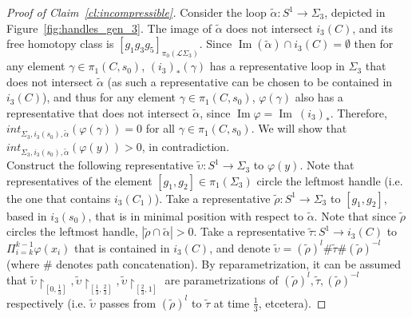 \documentclass[11pt]{article}
\DeclareMathOperator{\Ima}{Im}
\begin{document}
\begin{proof}[Proof of Claim~\ref{cl:incompressible}]
            Consider the loop $\tilde{\alpha}: S^1 \to \Sigma_3$, depicted in Figure~\ref{fig:handles_gen_3}. The image of $\tilde{\alpha}$ does not intersect $i_3(C)$, and its free homotopy class is $[g_1 g_3 g_5]_{\pi_0(\mathscr{L}\Sigma_3)}$. Since $\Ima(\tilde{\alpha}) \cap i_3(C) = \emptyset$ then for any element $\gamma \in \pi_1(C,s_0)$, $(i_3)_*(\gamma)$ has a representative loop in $\Sigma_3$ that does not intersect $\tilde{\alpha}$ (as such a representative can be chosen to be contained in $i_3(C)$), and thus for any element $\gamma \in \pi_1(C,s_0)$, $\varphi(\gamma)$ also has a representative that does not intersect $\tilde{\alpha}$, since $\Ima \varphi = \Ima \ (i_3)_*$. Therefore, $int_{\Sigma_3,i_3(s_0),\tilde{\alpha}}(\varphi(\gamma)) = 0$ for all $\gamma \in \pi_1(C,s_0)$. We will show that $int_{\Sigma_3,i_3(s_0),\tilde{\alpha}}(\varphi(y)) > 0$, in contradiction. \\
            
            Construct the following representative $\tilde{\upsilon}: S^1 \to \Sigma_3$ to $\varphi(y)$. Note that representatives of the element $[g_1,g_2] \in \pi_1(\Sigma_3)$ circle the leftmost handle (i.e. the one that contains $i_3(C_1)$). Take a representative $\tilde{\rho}: S^1 \to \Sigma_3$ to $[g_1,g_2]$, based in $i_3(s_0)$, that is in minimal position with respect to $\tilde{\alpha}$. Note that since $\tilde{\rho}$ circles the leftmost handle, $|\tilde{\rho} \cap \tilde{\alpha}| > 0$. Take a representative $\tilde{\tau}: S^1 \to i_3(C)$ to $\Pi_{i=k}^{k-1} \varphi(x_i)$ that is contained in $i_3(C)$, and denote $\tilde{\upsilon} = (\tilde{\rho})^l \# \tilde{\tau} \# (\tilde{\rho})^{-l}$ (where $\#$ denotes path concatenation). By reparametrization, it can be assumed that $\tilde{\upsilon} \restriction_{[0,\frac13]}, \tilde{\upsilon} \restriction_{[\frac13,\frac23]}, \tilde{\upsilon} \restriction_{[\frac23,1]}$ are parametrizations of $(\tilde{\rho})^l, \tilde{\tau}, (\tilde{\rho})^{-l}$ respectively (i.e. $\tilde{\upsilon}$ passes from $(\tilde{\rho})^l$ to $\tilde{\tau}$ at time $\frac13$, etcetera).
            

\end{proof}
\end{document}
